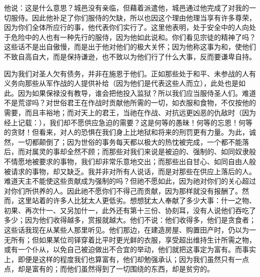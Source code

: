 他说：这是什么意思？城邑没有亲临，但藉着派遣他，城邑通过他完成了对我的一切服侍。因此他补足了你们服侍的欠缺，所以也因这个理由他理当享有许多尊荣，因为你们全体所应行的事，他代表你们实行了。这里他表明，处于安全中的人向处于危险中的人也有一种先行的服侍，因为他如此说和。你们看见宗徒的精神了吗？这些话不是出自傲慢，而是出于他对他们的极大关怀；因为他称这事为和，使他们不致自高自大，而是保持谦逊，也不致以为他们行了什么大事，反而要谦卑自持。\par

因为我们对圣人欠有债务，并非在施恩于他们。正如那些处于和平、未参战的人有义务向那些从军作战的人提供补给（因为他们是代表这些人而立），此处也是如此。因为如果保禄没有教导，谁会把他投入监狱？所以我们应当服侍圣人们。难道不是荒谬吗？对世俗君王在作战时贡献他所需的一切，如衣服和食物，不仅按他的需要，而且丰裕地；而对天上的君王，当祂在作战、对抗远更凶恶的仇敌时（因为经上记载：），我们却不愿供应急迫的需要？这是何等的愚昧！何等的忘恩！何等的贪财！但看来，对人的恐惧在我们身上比地狱和将来的刑罚更有力量。为此，诚然，一切都颠倒了；因为世俗的事务每天都以极大的热忱被完成，一个都不能落后，而对属灵的事却全然不顾；而那些对我们来说是被迫的、强制的、如同奴隶般不情愿地被要求的事物，我们却非常乐意地交出；而那些出自甘心、如同自由人般被请求的事物，却又缺乏。我并非对所有人说话，而是对那些在供应上落后的人。难道天主不能使这些贡献成为强制的吗？但祂不愿如此，因为祂对你们的关心超过对你们所供养的人。因此祂不愿你们不得己而贡献，因为那样就没有报酬了。然而，这里站着的许多人比犹太人更低劣。想想犹太人奉献了多少大事：什一之物、初果、再次什一、又另加什一，此外还有第十三份、协刻耳，没有人说他们吞吃了多少；因为他们收得越多，赏报就越大。他们不说：他们收得多，他们是贪食者；这些话我现在从某些人那里听见。他们那边，在建造房屋、购置田产时，仍以为一无所有；但如果某位司铎穿着比平时更光鲜的衣服，享受超出维持生计所需之物，或有一个仆从，以免自己被迫做出不合宜的举动，他们就把这事定为富有。而事实上，即便是这样的程度我们也算富有，他们却勉强承认；因为我们虽然只有一点点，却是富有的；而他们虽然得到了一切围绕的东西，却是贫穷的。\par

